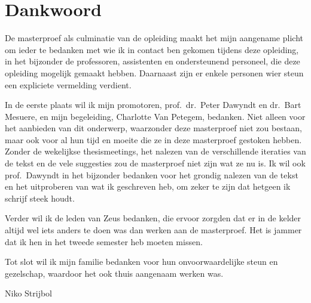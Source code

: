 \chapter*{Dankwoord}\label{ch:dankwoord}

De masterproef als culminatie van de opleiding maakt het mijn aangename plicht om ieder te bedanken met wie ik in contact ben gekomen tijdens deze opleiding, in het bijzonder de professoren, assistenten en ondersteunend personeel, die deze opleiding mogelijk gemaakt hebben.
Daarnaast zijn er enkele personen wier steun een expliciete vermelding verdient.

In de eerste plaats wil ik mijn promotoren, prof.\ dr.\ Peter Dawyndt en dr.\ Bart Mesuere, en mijn begeleiding, Charlotte Van Petegem, bedanken.
Niet alleen voor het aanbieden van dit onderwerp, waarzonder deze masterproef niet zou bestaan, maar ook voor al hun tijd en moeite die ze in deze masterproef gestoken hebben.
Zonder de wekelijkse thesismeetings, het nalezen van de verschillende iteraties van de tekst en de vele suggesties zou de masterproef niet zijn wat ze nu is.
Ik wil ook prof.\ Dawyndt in het bijzonder bedanken voor het grondig nalezen van de tekst en het uitproberen van wat ik geschreven heb, om zeker te zijn dat hetgeen ik schrijf steek houdt.

Verder wil ik de leden van Zeus  bedanken, die ervoor zorgden dat er in de kelder altijd wel iets anders te doen was dan werken aan de masterproef.
Het is jammer dat ik hen in het tweede semester heb moeten missen.

Tot slot wil ik mijn familie bedanken voor hun onvoorwaardelijke steun en gezelschap, waardoor het ook thuis aangenaam werken was.

\begin{flushright}
    Niko Strijbol
\end{flushright}
